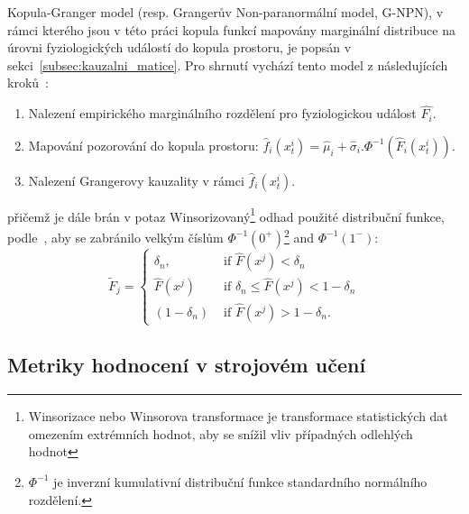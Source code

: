 Kopula-Granger model (resp. Grangerův Non-paranormální model, G-NPN), v rámci
kterého jsou v této práci kopula funkcí mapovány marginální distribuce na úrovni
fyziologických událostí do kopula prostoru, je popsán v
sekci~\ref{subsec:kauzalni_matice}. Pro shrnutí vychází tento model z
následujících kroků~\cite{Guy2016}:
\begin{enumerate}
    \item Nalezení empirického marginálního rozdělení pro fyziologickou událost
          $\hat{F_i}$.
    \item Mapování pozorování do kopula prostoru:
          $\hat{f}_i\left(x_t^i\right)=\hat{\mu}_i+\hat{\sigma}_i.
              \Phi^{-1}\left(\hat{F}_i\left(x_t^i\right)\right)$.
    \item Nalezení Grangerovy kauzality v rámci $\hat{f}_i\left(x_t^i\right)$.
\end{enumerate}
přičemž je dále brán v potaz Winsorizovaný\footnote{Winsorizace nebo Winsorova
    transformace je transformace statistických dat omezením extrémních hodnot, aby
    se snížil vliv případných odlehlých hodnot} odhad použité distribuční funkce,
podle~\cite{Bahadori2013}, aby se zabránilo velkým číslům
$\Phi^{-1}\left(0^{+}\right)$\footnote{$\Phi^{-1}$ je inverzní kumulativní
    distribuční funkce standardního normálního rozdělení.} and
$\Phi^{-1}\left(1^{-}\right)$:
\begin{equation}
    \tilde{F}_j= \begin{cases}\delta_n, & \text { if } \hat{F}\left(x^j\right)<\delta_n \\ \hat{F}\left(x^j\right) & \text { if } \delta_n \leq \hat{F}\left(x^j\right)<1-\delta_n \\ \left(1-\delta_n\right) & \text { if } \hat{F}\left(x^j\right)>1-\delta_n .\end{cases}
\end{equation}

\subsection{Metriky hodnocení v strojovém učení}
\label{subsec:ml_metriky}


